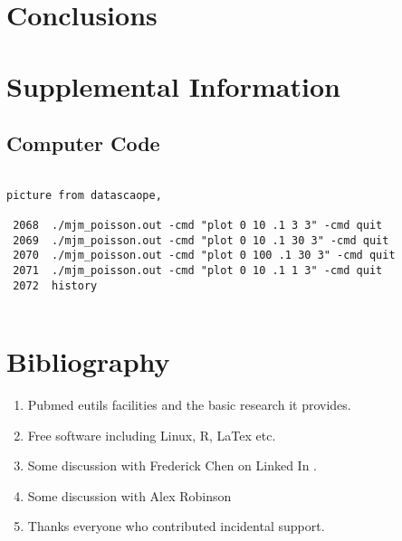 

\section{Conclusions}

\section{Supplemental Information}

\subsection{Computer Code}


\begin{lstlisting}

picture from datascaope, 

 2068  ./mjm_poisson.out -cmd "plot 0 10 .1 3 3" -cmd quit
 2069  ./mjm_poisson.out -cmd "plot 0 10 .1 30 3" -cmd quit
 2070  ./mjm_poisson.out -cmd "plot 0 100 .1 30 3" -cmd quit
 2071  ./mjm_poisson.out -cmd "plot 0 10 .1 1 3" -cmd quit
 2072  history


\end{lstlisting}
\section{Bibliography}






\begin{acknowledgments} 

% 
\begin{enumerate}
\item Pubmed eutils facilities and the basic research it provides. 
\item Free software including Linux, R, LaTex  etc.
\item Some discussion with Frederick Chen   on Linked In \cite{Chen_Chen_Chen_Kaohsiung_City_Kaohsiung_City_2025}.
\item Some discussion with Alex Robinson \cite{Robinson_West_Midlands_England_United_2025}
\item Thanks everyone who contributed incidental support. 
\end{enumerate}

\end{acknowledgments}

